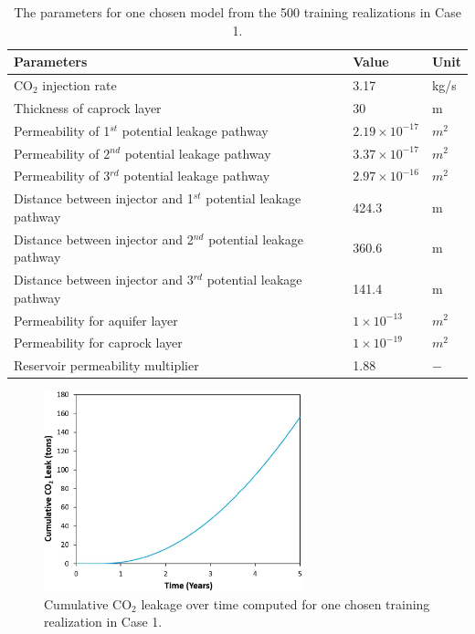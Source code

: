 \documentclass[a4paper,fleqn]{cas-sc}
\begin{document}
\begin{table}[width=.9\linewidth,cols=3,pos=h]
    \caption{The parameters for one chosen model from the 500 training realizations in Case 1.}\label{tbl:2}
    \begin{tabular*}{\tblwidth}{@{} LLL@{} }
    \toprule
    \textbf{Parameters} & \textbf{Value} & \textbf{Unit}  \\
    \midrule
    CO$_2$ injection rate & 3.17 & kg/s \\
    Thickness of caprock layer & 30 & m \\
    Permeability of 1$^{st}$ potential leakage pathway & $2.19\times 10^{-17}$ & $m^2$ \\
    Permeability of 2$^{nd}$ potential leakage pathway & $3.37\times 10^{-17}$ & $m^2$ \\
    Permeability of 3$^{rd}$ potential leakage pathway & $2.97\times 10^{-16}$ & $m^2$ \\
    Distance between injector and 1$^{st}$ potential leakage pathway & 424.3 & m \\
    Distance between injector and 2$^{nd}$ potential leakage pathway & 360.6 & m \\
    Distance between injector and 3$^{rd}$ potential leakage pathway & 141.4 & m \\
    Permeability for aquifer layer & $1\times 10^{-13}$ & $m^2$ \\
    Permeability for caprock layer & $1\times 10^{-19}$ & $m^2$  \\
    Reservoir permeability multiplier & 1.88 & $-$   \\  
    \bottomrule
    \end{tabular*}
\end{table}

\begin{figure}
    \centering
    \includegraphics[width=7.5cm]{figs/Figure 8.pdf}
    \caption{Cumulative CO$_2$ leakage over time computed for one chosen training realization in Case 1.}
    \label{cum_leak_line}
\end{figure}
\end{document}
